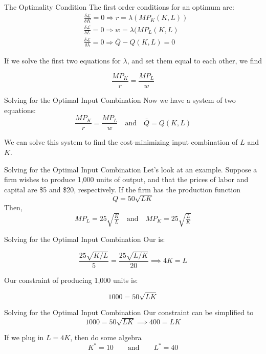\documentclass{beamer}
\begin{document}
\begin{frame}{The Optimality Condition}
  The first order conditions for an optimum are:
  \begin{align*}
      & \frac{\delta \mathcal{L}}{\delta K}=0 \Rightarrow r = \lambda(MP_K(K,L))      \\
      & \frac{\delta \mathcal{L}}{\delta L}=0 \Rightarrow w = \lambda(MP_L(K,L)       \\
      & \frac{\delta \mathcal{L}}{\delta \lambda}=0 \Rightarrow \bar{Q} - Q(K,L) = 0
  \end{align*}

  If we solve the first two equations for $\lambda$, and set them equal to each other, we find
  
  $$
    \frac{MP_K}{r} = \frac{MP_L}{w}
  $$
\end{frame}

\begin{frame}{Solving for the Optimal Input Combination}
  Now we have a system of two equations:
  $$
    \frac{MP_K}{r} = \frac{MP_L}{w} \quad\text{and}\quad \bar{Q} = Q(K,L)
  $$

  \bigskip We can solve this system to find the cost-minimizing input combination of $L$ and $K$.
\end{frame}

\begin{frame}{Solving for the Optimal Input Combination}
  Let's look at an example. Suppose a firm wishes to produce 1,000 units of output, and that the prices of labor and capital are \$5 and \$20, respectively. If the firm has the production function\
  $$
    Q = 50 \sqrt{LK}
  $$
  Then,
  $$
    MP_L = 25\sqrt{\tfrac{K}{L}} \quad\text{and}\quad MP_K = 25\sqrt{\tfrac{L}{K}}
  $$
\end{frame}

\begin{frame}{Solving for the Optimal Input Combination}
  Our  is:
  
  $$
    \frac{25\sqrt{K/L}}{5} = \frac{25\sqrt{L/K}}{20} \implies 4K = L
  $$

  \bigskip
  Our constraint of producing 1,000 units is:
  
  $$
    1000 = 50 \sqrt{LK}
  $$
\end{frame}

\begin{frame}{Solving for the Optimal Input Combination}
  Our constraint can be simplified to
  $$
    1000 = 50 \sqrt{LK} \implies 400 = LK
  $$

  \bigskip
  If we plug in $L = 4K$, then do some algebra
  \begin{equation*}
    K^* = 10 \qquad \text{and} \qquad L^* = 40
  \end{equation*}
\end{frame}
\end{document}
